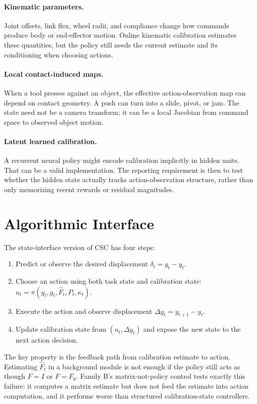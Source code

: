 \documentclass{article}
\newcommand{\obs}{y}
\newcommand{\goal}{g}
\newcommand{\act}{u}
\newcommand{\cmap}{F}
\newcommand{\cmaphat}{\hat F}
\newcommand{\cov}{P}
\begin{document}
\paragraph{Kinematic parameters.}
Joint offsets, link flex, wheel radii, and compliance change how commands
produce body or end-effector motion. Online kinematic calibration estimates
these quantities, but the policy still needs the current estimate and its
conditioning when choosing actions.

\paragraph{Local contact-induced maps.}
When a tool presses against an object, the effective action-observation map can
depend on contact geometry. A push can turn into a slide, pivot, or jam. The
state need not be a camera transform; it can be a local Jacobian from command
space to observed object motion.

\paragraph{Latent learned calibration.}
A recurrent neural policy might encode calibration implicitly in hidden units.
That can be a valid implementation. The reporting requirement is then to test
whether the hidden state actually tracks action-observation structure, rather
than only memorizing recent rewards or residual magnitudes.

\section{Algorithmic Interface}

The state-interface version of CSC has four steps:
\begin{enumerate}[leftmargin=*]
\item Predict or observe the desired displacement $\delta_t=\goal_t-\obs_t$.
\item Choose an action using both task state and calibration state:
$\act_t=\pi(\obs_t,\goal_t,\cmaphat_t,\cov_t,\kappa_t)$.
\item Execute the action and observe displacement
$\Delta\obs_t=\obs_{t+1}-\obs_t$.
\item Update calibration state from $(\act_t,\Delta\obs_t)$ and expose the new
state to the next action decision.
\end{enumerate}
The key property is the feedback path from calibration estimate to action.
Estimating $\cmaphat_t$ in a background module is not enough if the policy still
acts as though $\cmap=I$ or $\cmap=\cmap_0$. Family B's matrix-not-policy control
tests exactly this failure: it computes a matrix estimate but does not feed the
estimate into action computation, and it performs worse than structured
calibration-state controllers.
\end{document}
